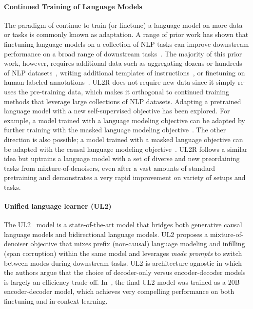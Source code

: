 \documentclass{article}
\newcommand{\methodname}{UL2R\xspace}
\begin{document}
\paragraph{Continued Training of Language Models} 
The paradigm of continue to train (or finetune) a language model on more data or tasks is commonly known as adaptation. 
A range of prior work has shown that finetuning language models on a collection of NLP tasks can improve downstream performance on a broad range of downstream tasks~\citep[][\textit{inter alia}]{aghajanyan2021muppet,aribandi2022ext5,wei2021finetuned,sanh2022multitask,ouyang2022training}.
The majority of this prior work, however, requires additional data such as aggregating dozens or hundreds of NLP datasets~\citep{raffel2019exploring,aghajanyan2021muppet,aribandi2022ext5}, writing additional templates of instructions~\citep{wei2021finetuned,sanh2022multitask}, or finetuning on human-labeled annotations~\citep{ouyang2022training}.
\methodname does not require new data since it simply re-uses the pre-training data, which makes it orthogonal to continued training methods that leverage large collections of NLP datasets.
Adapting a pretrained language model with a new self-supervised objective has been explored. For example, a model trained with a language modeling objective can be adapted by further training with the masked language modeling objective~\citep{wang2022language}. The other direction is also possible; a model trained with a masked language objective can be adapted with the causal language modeling objective~\citep{wang2022language,lester2021power}.
\methodname follows a similar idea but uptrains a language model with a set of diverse and new preordaining tasks from mixture-of-denoisers, even after a vast amounts of standard pretraining and demonstrates a very rapid improvement on variety of setups and tasks.


\paragraph{Unified language learner (UL2) } The UL2~\citep{tay2022unifying} model is a state-of-the-art model that bridges both generative causal language models and bidirectional language models. UL2 proposes a mixture-of-denoiser objective that mixes prefix (non-causal) language modeling and infilling (span corruption) within the same model and leverages \textit{mode prompts} to switch between modes during downstream tasks. UL2 is architecture agnostic in which the authors argue that the choice of decoder-only versus encoder-decoder models is largely an efficiency trade-off. In~\citep{tay2022unifying}, the final UL2 model was trained as a 20B encoder-decoder model, which achieves very compelling performance on both finetuning and in-context learning.
\end{document}
